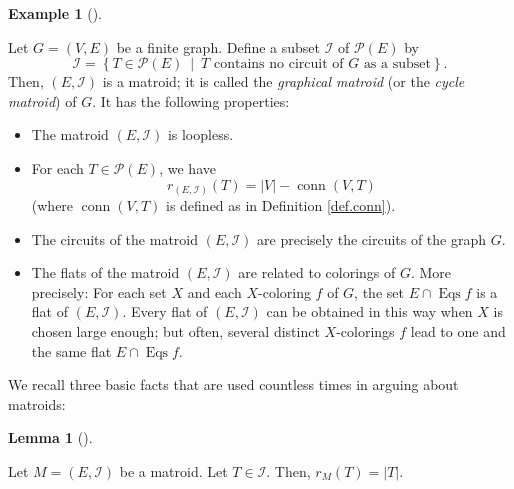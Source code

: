 \documentclass[numbers=enddot,12pt,final,onecolumn,notitlepage]{scrartcl}%
\theoremstyle{definition}
\newtheorem{lem}[theo]{Lemma}
\newenvironment{lemma}[1][]
{\begin{lem}[#1]\begin{leftbar}}
{\end{leftbar}\end{lem}}
\newtheorem{exmp}[theo]{Example}
\newenvironment{example}[1][]
{\begin{exmp}[#1]\begin{leftbar}}
{\end{leftbar}\end{exmp}}
\begin{document}
\begin{example}
\label{exam.matroid.graphical}Let $G=\left(  V,E\right)  $ be a finite graph.
Define a subset $\mathcal{I}$ of $\mathcal{P}\left(  E\right)  $ by%
\[
\mathcal{I}=\left\{  T\in\mathcal{P}\left(  E\right)  \ \mid\ T\text{ contains
no circuit of }G\text{ as a subset}\right\}  .
\]
Then, $\left(  E,\mathcal{I}\right)  $ is a matroid; it is called the
\emph{graphical matroid} (or the \emph{cycle matroid}) of $G$. It has the
following properties:

\begin{itemize}
\item The matroid $\left(  E,\mathcal{I}\right)  $ is loopless.

\item For each $T\in\mathcal{P}\left(  E\right)  $, we have%
\[
r_{\left(  E,\mathcal{I}\right)  }\left(  T\right)  =\left\vert V\right\vert
-\operatorname*{conn}\left(  V,T\right)
\]
(where $\operatorname*{conn}\left(  V,T\right)  $ is defined as in Definition
\ref{def.conn}).

\item The circuits of the matroid $\left(  E,\mathcal{I}\right)  $ are
precisely the circuits of the graph $G$.

\item The flats of the matroid $\left(  E,\mathcal{I}\right)  $ are related to
colorings of $G$. More precisely: For each set $X$ and each $X$-coloring $f$
of $G$, the set $E\cap\operatorname*{Eqs}f$ is a flat of $\left(
E,\mathcal{I}\right)  $. Every flat of $\left(  E,\mathcal{I}\right)  $ can be
obtained in this way when $X$ is chosen large enough; but often, several
distinct $X$-colorings $f$ lead to one and the same flat $E\cap
\operatorname*{Eqs}f$.
\end{itemize}
\end{example}

We recall three basic facts that are used countless times in arguing about matroids:

\begin{lemma}
\label{lem.matroid.rI}Let $M=\left(  E,\mathcal{I}\right)  $ be a matroid. Let
$T\in\mathcal{I}$. Then, $r_{M}\left(  T\right)  =\left\vert T\right\vert $.
\end{lemma}
\end{document}
